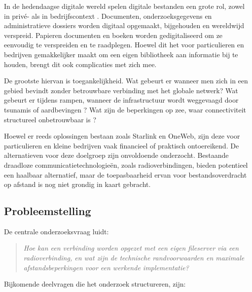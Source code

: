 
In de hedendaagse digitale wereld spelen digitale bestanden een grote rol, zowel in privé- als in bedrijfscontext \autocite{MaritimeSurvey2022}. Documenten, onderzoeksgegevens en administratieve dossiers worden digitaal opgemaakt, bijgehouden en wereldwijd verspreid. Papieren documenten en boeken worden gedigitaliseerd om ze eenvoudig te verspreiden en te raadplegen. Hoewel dit het voor particulieren en bedrijven gemakkelijker maakt om een eigen bibliotheek aan informatie bij te houden, brengt dit ook complicaties met zich mee.

De grootste hiervan is toegankelijkheid. Wat gebeurt er wanneer men zich in een gebied bevindt zonder betrouwbare verbinding met het globale netwerk? Wat gebeurt er tijdens rampen, wanneer de infrastructuur wordt weggevaagd door tsunamis of aardbevingen \autocite{WinlinkEmcomm}? Wat zijn de beperkingen op zee, waar connectiviteit structureel onbetrouwbaar is \autocite{MaritimeSurvey2022}?

Hoewel er reeds oplossingen bestaan zoals Starlink en OneWeb, zijn deze voor particulieren en kleine bedrijven vaak financieel of praktisch ontoereikend. De alternatieven voor deze doelgroep zijn onvoldoende onderzocht. Bestaande draadloze communicatietechnologieën, zoals radioverbindingen, bieden potentieel een haalbaar alternatief, maar de toepasbaarheid ervan voor bestandsoverdracht op afstand is nog niet grondig in kaart gebracht.

\subsection*{Probleemstelling}

De centrale onderzoeksvraag luidt:

\begin{quote}
  \textit{Hoe kan een verbinding worden opgezet met een eigen fileserver via een radioverbinding, en wat zijn de technische randvoorwaarden en maximale afstandsbeperkingen voor een werkende implementatie?}
\end{quote}

Bijkomende deelvragen die het onderzoek structureren, zijn:

